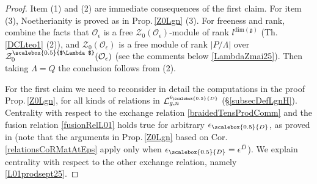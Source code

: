 \documentclass[11pt]{amsart}
\newcommand{\e}{\epsilon}
\newcommand{\Ll}{\mathcal{L}}
\newcommand{\Oo}{\mathcal{O}}
\newcommand{\eD}{\epsilon_{\scalebox{0.5}{D}}}
\newcommand{\Lam}{{\scalebox{0.5}{$\Lambda$}}}
\begin{document}
\begin{proof}
Item (1) and (2) are immediate consequences of the first claim. For item (3), Noetherianity is proved as in Prop.\,\ref{Z0Lgn} (3). For freeness and rank, combine the facts that $\Oo_{\e}$ is a free $\mathcal{Z}_0(\Oo_\e)$-module of rank $l^{\mathrm{dim}(\mathfrak{g})}$ (Th.\,\ref{DCLteo1} (2)), and $\mathcal{Z}_0(\Oo_{\e})$ is a free module of rank $\vert P/\Lambda\vert$ over $\mathcal{Z}_0^\Lam(\Oo_{\e})$ (see the comments below \eqref{LambdaZmai25}). Then taking $\Lambda=Q$ the conclusion follows from (2).

For the first claim we need to reconsider in detail the computations in the proof Prop.\,\ref{Z0Lgn}, for all kinds of relations in $\Ll_{g,n}^{\eD}$ (\S \ref{subsecDefLgnH}). Centrality with respect to the exchange relation \eqref{braidedTensProdComm} and the fusion relation \eqref{fusionRelL01} holds true for arbitrary $\eD$, as proved in \cite[Prop.\,4.1]{BR2} (note that the arguments in Prop.\,\ref{Z0Lgn} based on Cor.\,\ref{relationsCoRMatAtEps} apply only when $\eD = \e^{\bar{D}}$). We explain centrality with respect to the other exchange relation, namely \eqref{L01prodsept25}.


\end{proof}
\end{document}
